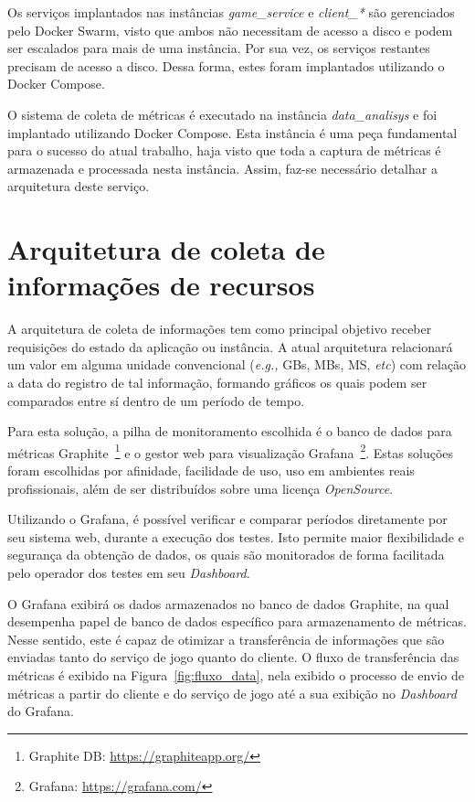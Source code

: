 Os serviços implantados nas instâncias \textit{game\_service} e \textit{client\_*} são gerenciados pelo Docker Swarm, visto que ambos não necessitam de acesso a disco e podem ser escalados para mais de uma instância.
%
Por sua vez, os serviços restantes precisam de acesso a disco. 
%
Dessa forma, estes foram implantados utilizando o Docker Compose.


O sistema de coleta de métricas é executado na instância \textit{data\_analisys} e foi implantado utilizando Docker Compose.
%
Esta instância é uma peça fundamental para o sucesso do atual trabalho, haja visto que toda a captura de métricas é armazenada e processada nesta instância.
%
Assim, faz-se necessário detalhar a arquitetura deste serviço.


\section{Arquitetura de coleta de informações de recursos}
\label{sec:informacoes}

A arquitetura de coleta de informações tem como principal objetivo receber requisições do estado da aplicação ou instância.
%
A atual arquitetura relacionará um valor em alguma unidade convencional (\textit{e.g.,} GBs, MBs, MS, \textit{etc}) com relação a data do registro de tal informação, formando gráficos os quais podem ser comparados entre sí dentro de um período de tempo.

Para esta solução, a pilha de monitoramento escolhida é o banco de dados para métricas Graphite~\footnote{Graphite DB: \url{https://graphiteapp.org/}} e o gestor web para visualização Grafana~\footnote{Grafana: \url{https://grafana.com/}}.
%
Estas soluções foram escolhidas por afinidade, facilidade de uso, uso em ambientes reais profissionais, além de ser distribuídos sobre uma licença \textit{OpenSource}.


Utilizando o Grafana, é possível verificar e comparar períodos diretamente por seu sistema web, durante a execução dos testes.
%
Isto permite maior flexibilidade e segurança da obtenção de dados, os quais são monitorados de forma facilitada pelo operador dos testes em seu \textit{Dashboard}.

O Grafana exibirá os dados armazenados no banco de dados Graphite, na qual desempenha papel de banco de dados específico para armazenamento de métricas.
%
Nesse sentido, este é capaz de otimizar a transferência de informações que são enviadas tanto do serviço de jogo quanto do cliente.
%
O fluxo de transferência das métricas é exibido na Figura~\ref{fig:fluxo_data}, nela exibido o processo de envio de métricas a partir do cliente e do serviço de jogo até a sua exibição no \textit{Dashboard} do Grafana.

